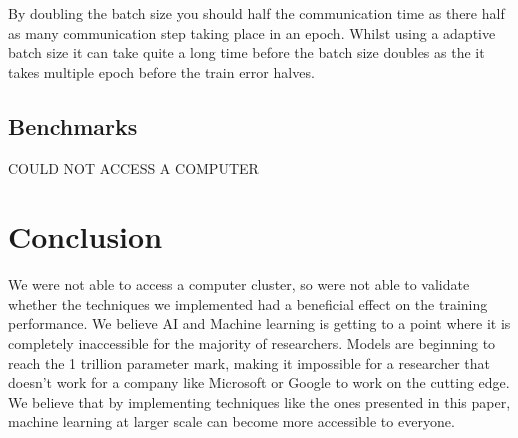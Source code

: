 \documentclass[twocolumn,10pt]{article}
\begin{document}
By doubling the batch size you should half the communication time as there half as many communication step taking place in an epoch. Whilst using a adaptive batch size it can take quite a long time before the batch size doubles as the it takes multiple epoch before the train error halves.


\subsection{Benchmarks}
\begin{Huge}
\begin{center}
COULD NOT ACCESS A COMPUTER
\end{center}
\end{Huge}

\newpage
\section{Conclusion}
We were not able to access a computer cluster, so were not able to validate whether the techniques we implemented had a beneficial effect on the training performance. We believe AI and Machine learning is getting to a point where it is completely inaccessible for the majority of researchers. Models are beginning to reach the 1 trillion parameter mark, making it impossible for a researcher that doesn't work for a company like Microsoft or Google to work on the cutting edge. We believe that by implementing techniques like the ones presented in this paper, machine learning at larger scale can become more accessible to everyone.

\newpage



\end{document}
